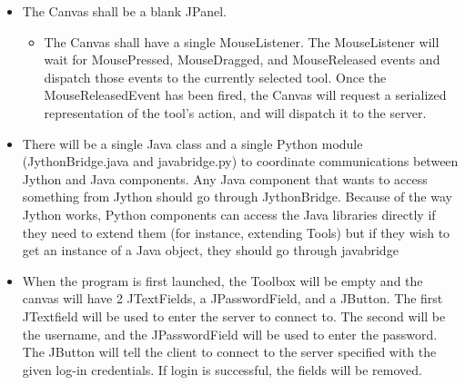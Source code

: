 \documentclass[12pt]{article}
\begin{document}
\begin{itemize}
  \item
  The Canvas shall be a blank JPanel.
  \begin{itemize}
      \item
      The Canvas shall have a single MouseListener. The MouseListener will wait for MousePressed, MouseDragged, and MouseReleased events and dispatch those events to the currently selected tool. Once the MouseReleasedEvent has been fired, the Canvas will request a serialized representation of the tool's action, and will dispatch it to the server.
  \end{itemize}
  \item
      There will be a single Java class and a single Python module (JythonBridge.java and javabridge.py) to coordinate communications between Jython and Java components. Any Java component that wants to access something from Jython should go through JythonBridge. Because of the way Jython works, Python components can access the Java libraries directly if they need to extend them (for instance, extending Tools) but if they wish to get an instance of a Java object, they should go through javabridge
  \item
     When the program is first launched, the Toolbox will be empty and the canvas will have 2 JTextFields, a JPasswordField, and a JButton. The first JTextfield will be used to enter the server to connect to. The second will be the username, and the JPasswordField will be used to enter the password. The JButton will tell the client to connect to the server specified with the given log-in credentials. If login is successful, the fields will be removed.
\end{itemize}
\end{document}
